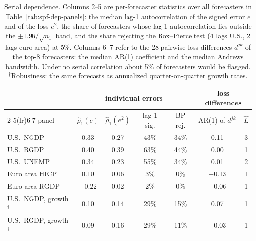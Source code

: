 \begin{table}[htb]
  \centering
  \caption[Serial dependence in SPF errors]{Serial dependence. Columns 2--5 are per-forecaster statistics over all
  forecasters in Table~\ref{tab:spf-dep-panels}: the median lag-1 autocorrelation of the signed error $e$ and of the
  loss $e^2$, the share of forecasters whose lag-1 autocorrelation lies outside the $\pm1.96/\sqrt{n_1}$ band, and the
  share rejecting the Box--Pierce test (4 lags U.S., 2 lags euro area) at 5\%. Columns 6--7 refer to the 28 pairwise
  loss differences $d^{jk}$ of the top-8 forecasters: the median AR(1) coefficient and the median Andrews bandwidth.
  Under no serial correlation about 5\% of forecasters would be flagged. $^\dagger$Robustness: the same forecasts
  as annualized quarter-on-quarter growth rates.}
  \label{tab:spf-dep-serial}
  \small
  \begin{tabular}{lcccccc}
    \toprule
    & \multicolumn{4}{c}{individual errors} & \multicolumn{2}{c}{loss differences}\\
    \cmidrule(lr){2-5}\cmidrule(lr){6-7}
    panel & $\hat\rho_1(e)$ & $\hat\rho_1(e^2)$ & lag-1 sig. & BP rej. & AR(1) of $d^{jk}$ & $\hat L$\\
    \midrule
    U.S.\ NGDP & 0.33 & 0.27 & 43\% & 34\% & 0.11 & 3\\
    U.S.\ RGDP & 0.40 & 0.39 & 63\% & 44\% & 0.00 & 1\\
    U.S.\ UNEMP & 0.34 & 0.23 & 55\% & 34\% & 0.01 & 2\\
    Euro area HICP & 0.10 & 0.06 & 3\% & 0\% & $-0.13$ & 1\\
    Euro area RGDP & $-0.22$ & 0.02 & 2\% & 0\% & $-0.06$ & 1\\
    \midrule
    U.S.\ NGDP, growth$^\dagger$ & 0.10 & 0.14 & 29\% & 15\% & 0.07 & 1\\
    U.S.\ RGDP, growth$^\dagger$ & 0.09 & 0.16 & 29\% & 11\% & $-0.03$ & 1\\
    \bottomrule
  \end{tabular}
\end{table}
